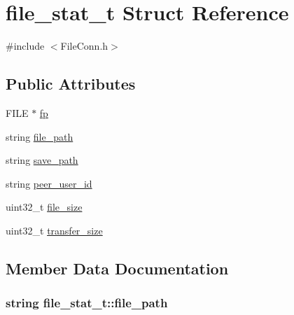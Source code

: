 \hypertarget{structfile__stat__t}{}\section{file\+\_\+stat\+\_\+t Struct Reference}
\label{structfile__stat__t}


{\ttfamily \#include $<$File\+Conn.\+h$>$}

\subsection*{Public Attributes}
\begin{DoxyCompactItemize}
\item 
F\+I\+L\+E $\ast$ \hyperlink{structfile__stat__t_a9fcf91f5f973b48ffa80281f610e4d21}{fp}
\item 
string \hyperlink{structfile__stat__t_a091452719ae03f0509f214b0dfac7812}{file\+\_\+path}
\item 
string \hyperlink{structfile__stat__t_a8f4962b17d91d7a0f0b95c5958f30033}{save\+\_\+path}
\item 
string \hyperlink{structfile__stat__t_a1f13796c2b28c0f3410e9240cf9fd0d4}{peer\+\_\+user\+\_\+id}
\item 
uint32\+\_\+t \hyperlink{structfile__stat__t_a7961401dd2c87e2f249ecd5ca817b007}{file\+\_\+size}
\item 
uint32\+\_\+t \hyperlink{structfile__stat__t_aaf6799241960a0d87ebf032548e436cd}{transfer\+\_\+size}
\end{DoxyCompactItemize}


\subsection{Member Data Documentation}
\hypertarget{structfile__stat__t_a091452719ae03f0509f214b0dfac7812}{}
\subsubsection[{file\+\_\+path}]{\setlength{\rightskip}{0pt plus 5cm}string file\+\_\+stat\+\_\+t\+::file\+\_\+path}\label{structfile__stat__t_a091452719ae03f0509f214b0dfac7812}
\hypertarget{structfile__stat__t_a7961401dd2c87e2f249ecd5ca817b007}{}
